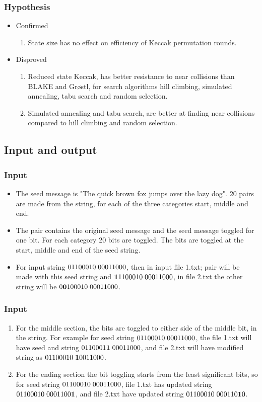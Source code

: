 \documentclass{beamer}
\begin{document}
\begin{frame}
\frametitle{Hypothesis}
\begin{itemize}
\item Confirmed
\begin{enumerate}
\item State size has no effect on efficiency of Keccak permutation rounds.
\end{enumerate}
\item Disproved
\begin{enumerate}
\item Reduced state Keccak, has better resistance to near collisions than BLAKE and Gr{\o}stl,
for search algorithms hill climbing, simulated annealing, tabu search and random selection.
\item Simulated annealing and tabu search, are better at finding near collisions compared to
hill climbing and random selection.
\end{enumerate}
\end{itemize}
\end{frame}

\subsection{Input and output}

\begin{frame}
\frametitle{Input}
\begin{itemize}
\item The seed message is "The quick brown fox jumps over the lazy dog". 20 pairs are made from the
string, for each of the three categories start, middle and end.
\item The pair contains the original seed message and the seed message toggled for one bit. For each
category 20 bits are toggled. The bits are toggled at the start, middle and end of the seed string.
\item For input string $01100010\thickspace00011000$, then in input file 1.txt; pair will be made with this seed
string and ${\bf 1}1100010\thickspace00011000$, in file 2.txt the other  string will be 
$0{\bf 0}100010\thickspace00011000$.
\end{itemize}
\end{frame}

\begin{frame}
\frametitle{Input}
\begin{enumerate}
\item For the middle section, the bits are toggled to either side of the middle bit, in the string. For example
for seed string $01100010\thickspace00011000$, the file 1.txt will have seed and string 
$0110001{\bf 1}\thickspace00011000$, and file 2.txt will have modified string as 
$01100010\thickspace{\bf 1}0011000$.
\item For the ending section the bit toggling starts from the least significant bits, so for seed string
$01100010\thickspace00011000$, file 1.txt has updated string $01100010\thickspace0001100{\bf 1}$, and 
file 2.txt have updated string $01100010\thickspace000110{\bf 1}0$.
\end{enumerate}
\end{frame}
\end{document}
